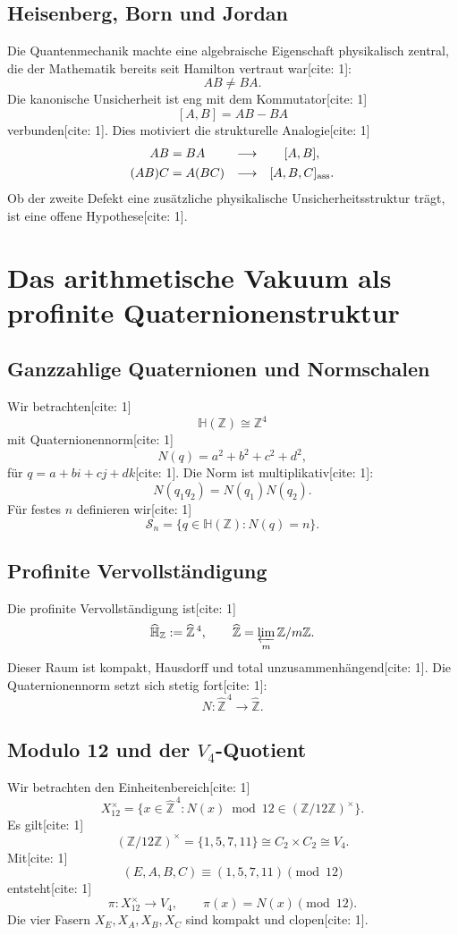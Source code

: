 \documentclass[11pt,a4paper]{article}
\newcommand{\HH}{\mathbb{H}}
\newcommand{\ZZ}{\mathbb{Z}}
\begin{document}
	\subsection{Heisenberg, Born und Jordan}
	Die Quantenmechanik machte eine algebraische Eigenschaft physikalisch zentral, die der Mathematik bereits seit Hamilton vertraut war[cite: 1]:
	\[
	AB\neq BA.
	\]
	Die kanonische Unsicherheit ist eng mit dem Kommutator[cite: 1]
	\[
	[A,B]=AB-BA
	\]
	verbunden[cite: 1]. Dies motiviert die strukturelle Analogie[cite: 1]
	\[
	\begin{array}{ccc}
		AB=BA &\longrightarrow& [A,B],\\[0.4em]
		(AB)C=A(BC) &\longrightarrow& [A,B,C]_{\rm ass}.
	\end{array}
	\]
	Ob der zweite Defekt eine zusätzliche physikalische Unsicherheitsstruktur trägt, ist eine offene Hypothese[cite: 1].
	
	\section{Das arithmetische Vakuum als profinite Quaternionenstruktur}
	\subsection{Ganzzahlige Quaternionen und Normschalen}
	Wir betrachten[cite: 1]
	\[
	\HH(\ZZ)\cong\ZZ^4
	\]
	mit Quaternionennorm[cite: 1]
	\[
	N(q)=a^2+b^2+c^2+d^2,
	\]
	für $q=a+bi+cj+dk$[cite: 1]. Die Norm ist multiplikativ[cite: 1]:
	\[
	\boxed{N(q_1q_2)=N(q_1)N(q_2).}
	\]
	Für festes $n$ definieren wir[cite: 1]
	\[
	\mathcal S_n=\{q\in\HH(\ZZ):N(q)=n\}.
	\]
	
	\subsection{Profinite Vervollständigung}
	Die profinite Vervollständigung ist[cite: 1]
	\[
	\widehat{\HH}_{\ZZ}:=\widehat{\ZZ}^{\,4},\qquad
	\widehat{\ZZ}=\varprojlim_m\ZZ/m\ZZ.
	\]
	Dieser Raum ist kompakt, Hausdorff und total unzusammenhängend[cite: 1]. Die Quaternionennorm setzt sich stetig fort[cite: 1]:
	\[
	N:\widehat{\ZZ}^{\,4}\to\widehat{\ZZ}.
	\]
	
	\subsection{Modulo 12 und der $V_4$-Quotient}
	Wir betrachten den Einheitenbereich[cite: 1]
	\[
	X_{12}^{\times}
	=
	\{x\in\widehat{\ZZ}^{\,4}:N(x)\bmod 12\in(\ZZ/12\ZZ)^\times\}.
	\]
	Es gilt[cite: 1]
	\[
	(\ZZ/12\ZZ)^\times=\{1,5,7,11\}\cong C_2\times C_2\cong V_4.
	\]
	Mit[cite: 1]
	\[
	(E,A,B,C)\equiv(1,5,7,11)\pmod{12}
	\]
	entsteht[cite: 1]
	\[
	\pi:X_{12}^{\times}\to V_4,\qquad \pi(x)=N(x)\pmod{12}.
	\]
	Die vier Fasern $X_E,X_A,X_B,X_C$ sind kompakt und clopen[cite: 1].
	
\end{document}

